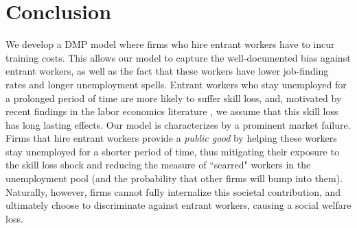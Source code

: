 \documentclass[12pt]{article} %
\theoremstyle{definition}
\begin{document}


\section{Conclusion}\label{section conclusion} 

We develop a DMP model where firms who hire entrant workers have to incur training costs. This allows our model to capture the well-documented bias against entrant workers, as well as the fact that these workers have lower job-finding rates and longer unemployment spells. Entrant workers who stay unemployed for a prolonged period of time are more likely to suffer skill loss, and, motivated by recent findings in the labor economics literature \citep{wachter2020persistent}, we assume that this skill loss has long lasting effects. Our model is characterizes by a prominent market failure. Firms that hire entrant workers provide a \textit{public good} by helping these workers stay unemployed for a shorter period of time, thus mitigating their exposure to the skill loss shock and reducing the measure of ``scarred" workers in the unemployment pool (and the probability that other firms will bump into them). Naturally, however, firms cannot fully internalize this societal contribution, and ultimately choose to discriminate against entrant workers, causing a social welfare loss.  
 
\end{document}
